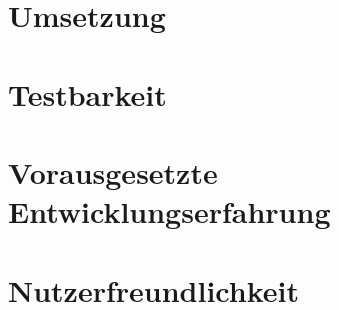 \section{Umsetzung} \label{sec:6-umsetzung}


\section{Testbarkeit} \label{sec:6-testbarkeit}


\section{Vorausgesetzte Entwicklungserfahrung} \label{sec:6-vorausgesetzte-entwicklungserfahrung}


\section{Nutzerfreundlichkeit} \label{sec:6-verstaendlichkeit}


